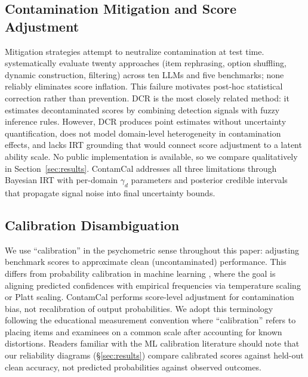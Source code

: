 \subsection{Contamination Mitigation and Score Adjustment}

Mitigation strategies attempt to neutralize contamination at test time. \citet{xu2025emperor} systematically evaluate twenty approaches (item rephrasing, option shuffling, dynamic construction, filtering) across ten LLMs and five benchmarks; none reliably eliminates score inflation. This failure motivates post-hoc statistical correction rather than prevention. DCR \citep{li_2025_dcr} is the most closely related method: it estimates decontaminated scores by combining detection signals with fuzzy inference rules. However, DCR produces point estimates without uncertainty quantification, does not model domain-level heterogeneity in contamination effects, and lacks IRT grounding that would connect score adjustment to a latent ability scale. No public implementation is available, so we compare qualitatively in Section~\ref{sec:results}. ContamCal addresses all three limitations through Bayesian IRT with per-domain $\gamma_d$ parameters and posterior credible intervals that propagate signal noise into final uncertainty bounds.

\subsection{Calibration Disambiguation}

We use ``calibration'' in the psychometric sense throughout this paper: adjusting benchmark scores to approximate clean (uncontaminated) performance. This differs from probability calibration in machine learning \citep{guo_2017_calibration}, where the goal is aligning predicted confidences with empirical frequencies via temperature scaling or Platt scaling. ContamCal performs score-level adjustment for contamination bias, not recalibration of output probabilities. We adopt this terminology following the educational measurement convention where ``calibration'' refers to placing items and examinees on a common scale after accounting for known distortions. Readers familiar with the ML calibration literature should note that our reliability diagrams (\S\ref{sec:results}) compare calibrated scores against held-out clean accuracy, not predicted probabilities against observed outcomes.
